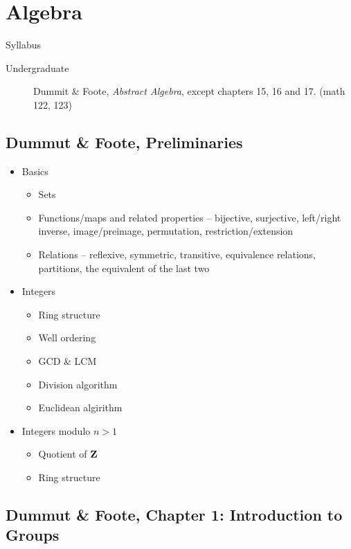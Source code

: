 \section{Algebra}
\label{S:algebra}

Syllabus
\begin{description}
\item[Undergraduate] Dummit \& Foote, \emph{Abstract Algebra}, except chapters 15, 16 and 17. (math 122, 123)
\end{description}

\subsection{Dummut \& Foote, Preliminaries}

\begin{itemize}
\item Basics
  \begin{itemize}
  \item Sets
  \item Functions/maps and related properties -- bijective, surjective, left/right inverse, image/preimage, permutation, restriction/extension
  \item Relations -- reflexive, symmetric, transitive, equivalence relations, partitions, the equivalent of the last two
  \end{itemize}
\item Integers
  \begin{itemize}
  \item Ring structure
  \item Well ordering
  \item GCD \& LCM
  \item Division algorithm
  \item Euclidean algirithm
  \end{itemize}
\item Integers modulo $n > 1$
  \begin{itemize}
  \item Quotient of $\mathbf{Z}$
  \item Ring structure
  \end{itemize}
\end{itemize}

\subsection{Dummut \& Foote, Chapter 1: Introduction to Groups}

